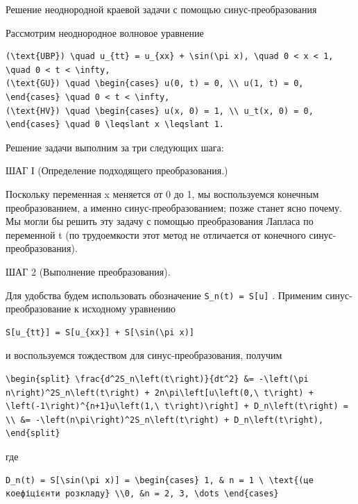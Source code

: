 \documentclass[
  ukrainian,
]{article}
\begin{document}
Решение неоднородной краевой задачи с помощью синус-преобразования

Рассмотрим неоднородное волновое уравнение

\begin{verbatim}
(\text{UBP}) \quad u_{tt} = u_{xx} + \sin(\pi x), \quad 0 < x < 1, \quad 0 < t < \infty,
(\text{GU}) \quad \begin{cases} u(0, t) = 0, \\ u(1, t) = 0, \end{cases} \quad 0 < t < \infty,
(\text{HV}) \quad \begin{cases} u(x, 0) = 1, \\ u_t(x, 0) = 0, \end{cases} \quad 0 \leqslant x \leqslant 1.
\end{verbatim}

Решение задачи выполним за три следующих шага:

ШАГ І (Определение подходящего преобразования.)

Поскольку переменная x меняется от 0 до 1, мы воспользуемся конечным
преобразованием, а именно синус-преобразованием; позже станет ясно
почему. Мы могли бы решить эту задачу с помощью преобразования Лапласа
по переменной t (по трудоемкости этот метод не отличается от конечного
синус-преобразования).

ШАГ 2 (Выполнение преобразования).

Для удобства будем использовать обозначение
\texttt{S\_n(t)\ =\ S{[}u{]}} . Применим синус-преобразование к
исходному уравнению

\begin{verbatim}
S[u_{tt}] = S[u_{xx}] + S[\sin(\pi x)]
\end{verbatim}

и воспользуемся тождеством для синус-преобразования, получим

\begin{verbatim}
\begin{split} \frac{d^2S_n\left(t\right)}{dt^2} &= -\left(\pi n\right)^2S_n\left(t\right) + 2n\pi\left[u\left(0,\ t\right) + \left(-1\right)^{n+1}u\left(1,\ t\right)\right] + D_n\left(t\right) = \\ &= -\left(n\pi\right)^2S_n\left(t\right) + D_n\left(t\right),  \end{split}
\end{verbatim}

где

\begin{verbatim}
D_n(t) = S[\sin(\pi x)] = \begin{cases} 1, & n = 1 \ \text{(це коефіцієнти розкладу} \\0, &n = 2, 3, \dots \end{cases}
\end{verbatim}
\end{document}
